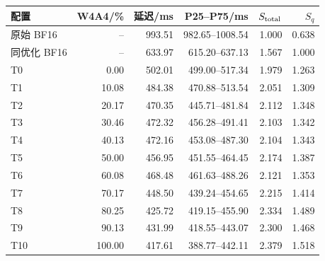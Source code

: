 \begin{tabular}{lrrrrr}
\toprule
配置 & W4A4/\% & 延迟/ms & P25--P75/ms & $S_{\rm total}$ & $S_q$ \\
\midrule
原始 BF16 & -- & 993.51 & 982.65--1008.54 & 1.000 & 0.638 \\
同优化 BF16 & -- & 633.97 & 615.20--637.13 & 1.567 & 1.000 \\
T0 & 0.00 & 502.01 & 499.00--517.34 & 1.979 & 1.263 \\
T1 & 10.08 & 484.38 & 470.88--513.54 & 2.051 & 1.309 \\
T2 & 20.17 & 470.35 & 445.71--481.84 & 2.112 & 1.348 \\
T3 & 30.46 & 472.32 & 456.28--491.41 & 2.103 & 1.342 \\
T4 & 40.13 & 472.16 & 453.08--487.30 & 2.104 & 1.343 \\
T5 & 50.00 & 456.95 & 451.55--464.45 & 2.174 & 1.387 \\
T6 & 60.08 & 468.48 & 461.63--488.26 & 2.121 & 1.353 \\
T7 & 70.17 & 448.50 & 439.24--454.65 & 2.215 & 1.414 \\
T8 & 80.25 & 425.72 & 419.15--455.90 & 2.334 & 1.489 \\
T9 & 90.13 & 431.99 & 418.55--443.07 & 2.300 & 1.468 \\
T10 & 100.00 & 417.61 & 388.77--442.11 & 2.379 & 1.518 \\
\bottomrule
\end{tabular}
